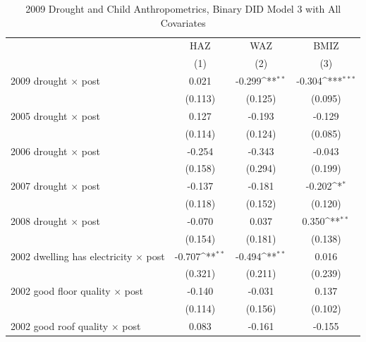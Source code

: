 \documentclass[12pt]{article}
\def\sym#1{\ifmmode^{#1}\else\(^{#1}\)\fi}
\begin{document}
\clearpage
\begingroup
\footnotesize
\renewcommand{\arraystretch}{0.86}
\setlength{\tabcolsep}{4pt}
\setlength{\LTcapwidth}{\textwidth}
\begin{longtable}{p{}ccc}
\caption{2009 Drought and Child Anthropometrics, Binary DID Model 3 with All Covariates}\\
\toprule
 & HAZ & WAZ & BMIZ\\
            &\multicolumn{1}{c}{(1)}         &\multicolumn{1}{c}{(2)}         &\multicolumn{1}{c}{(3)}         \\
\midrule
2009 drought \ensuremath{\times} post&       0.021         &      -0.299\sym{**} &      -0.304\sym{***}\\
            &     (0.113)         &     (0.125)         &     (0.095)         \\
2005 drought \ensuremath{\times} post&       0.127         &      -0.193         &      -0.129         \\
            &     (0.114)         &     (0.124)         &     (0.085)         \\
2006 drought \ensuremath{\times} post&      -0.254         &      -0.343         &      -0.043         \\
            &     (0.158)         &     (0.294)         &     (0.199)         \\
2007 drought \ensuremath{\times} post&      -0.137         &      -0.181         &      -0.202\sym{*}  \\
            &     (0.118)         &     (0.152)         &     (0.120)         \\
2008 drought \ensuremath{\times} post&      -0.070         &       0.037         &       0.350\sym{**} \\
            &     (0.154)         &     (0.181)         &     (0.138)         \\
2002 dwelling has electricity \ensuremath{\times} post&      -0.707\sym{**} &      -0.494\sym{**} &       0.016         \\
            &     (0.321)         &     (0.211)         &     (0.239)         \\
2002 good floor quality \ensuremath{\times} post&      -0.140         &      -0.031         &       0.137         \\
            &     (0.114)         &     (0.156)         &     (0.102)         \\
2002 good roof quality \ensuremath{\times} post&       0.083         &      -0.161         &      -0.155         \\

\end{longtable}
\end{document}
